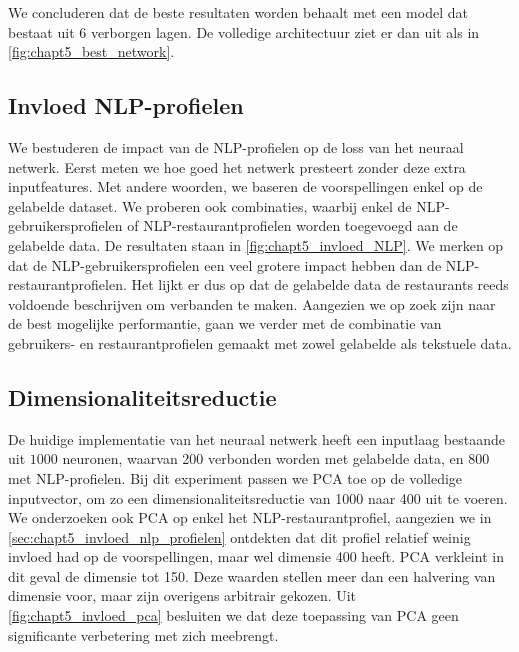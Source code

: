 We concluderen dat de beste resultaten worden behaalt met een model dat bestaat uit 6 verborgen lagen. De volledige architectuur ziet er dan uit als in \autoref{fig:chapt5_best_network}.






\subsection{Invloed NLP-profielen}
\label{sec:chapt5_invloed_nlp_profielen}
We bestuderen de impact van de NLP-profielen op de loss van het neuraal netwerk. Eerst meten we hoe goed het netwerk presteert zonder deze extra inputfeatures. Met andere woorden, we baseren de voorspellingen enkel op de gelabelde dataset. We proberen ook combinaties, waarbij enkel de NLP-gebruikersprofielen of NLP-restaurantprofielen worden toegevoegd aan de gelabelde data. De resultaten staan in \autoref{fig:chapt5_invloed_NLP}. We merken op dat de NLP-gebruikersprofielen een veel grotere impact hebben dan de NLP-restaurantprofielen. Het lijkt er dus op dat de gelabelde data de restaurants reeds voldoende beschrijven om verbanden te maken. Aangezien we op zoek zijn naar de best mogelijke performantie, gaan we verder met de combinatie van gebruikers- en restaurantprofielen gemaakt met zowel gelabelde als tekstuele data.



\subsection{Dimensionaliteitsreductie}
De huidige implementatie van het neuraal netwerk heeft een inputlaag bestaande uit $1000$ neuronen, waarvan 200 verbonden worden met gelabelde data, en 800 met NLP-profielen. Bij dit experiment passen we PCA toe op de volledige inputvector, om zo een dimensionaliteitsreductie van 1000 naar 400 uit te voeren. We onderzoeken ook PCA op enkel het NLP-restaurantprofiel, aangezien we in \autoref{sec:chapt5_invloed_nlp_profielen} ontdekten dat dit profiel relatief weinig invloed had op de voorspellingen, maar wel dimensie 400 heeft. PCA verkleint in dit geval de dimensie tot 150. Deze waarden stellen meer dan een halvering van dimensie voor, maar zijn overigens arbitrair gekozen. Uit \autoref{fig:chapt5_invloed_pca} besluiten we dat deze toepassing van PCA geen significante verbetering met zich meebrengt.

